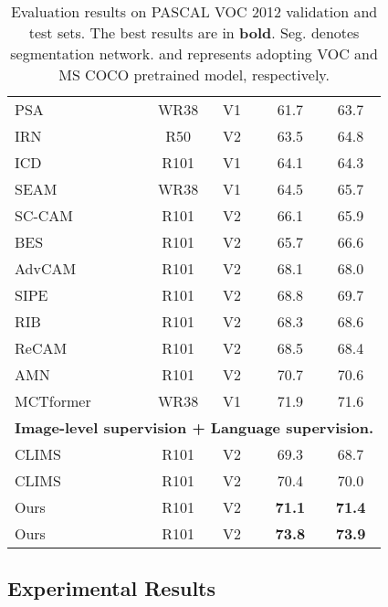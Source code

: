 \documentclass[10pt,twocolumn,letterpaper]{article}
\begin{document}
\begin{table}
\begin{tabular}{lclcc}
    PSA~\cite{Ahn2018PSA}       & WR38       & V1               & 61.7  & 63.7 \\
    IRN~\cite{Ahn2019IRN}       & R50        & V2               & 63.5  & 64.8 \\
ICD~\cite{Fan2020ICD}       & R101       & V1    & 64.1  & 64.3 \\
    SEAM~\cite{Wang2020SEAM}      & WR38       & V1               & 64.5  & 65.7 \\
    SC-CAM~\cite{Chang2020sc-cam}    & R101       & V2    & 66.1  & 65.9 \\
    BES~\cite{Chen2020bes}       & R101       & V2    & 65.7  & 66.6 \\
    AdvCAM~\cite{Lee2021advcam}    & R101       & V2               & 68.1  & 68.0 \\
    SIPE~\cite{Chen_2022_CVPR_SIPE}      & R101       & V2    & 68.8  & 69.7 \\
    RIB~\cite{Lee2021ReducingIB}       & R101       & V2               & 68.3  & 68.6 \\
    ReCAM~\cite{recam}     & R101       & V2               & 68.5  & 68.4 \\
    AMN~\cite{Lee2022AMN}       & R101       & V2    & 70.7  & 70.6 \\
    MCTformer~\cite{xu2022mctformer} & WR38       & V1     & 71.9  & 71.6 \\
\midrule
    \multicolumn{5}{l}{\textbf{Image-level supervision + Language supervision.}} \\
    
    CLIMS~\cite{Xie_2022_CLIMS}     & R101       & V2               & 69.3  & 68.7 \\
    CLIMS~\cite{Xie_2022_CLIMS}     & R101       & V2    & 70.4  & 70.0 \\
    Ours   & R101  & V2               & \textbf{71.1} & \textbf{71.4} \\
    Ours   & R101  & V2    & \textbf{73.8} & \textbf{73.9} \\
    \bottomrule
  \end{tabular}
  \caption{Evaluation results on PASCAL VOC 2012 validation and test sets. The best results are in \textbf{bold}. Seg. denotes segmentation network.  and  represents adopting VOC and MS COCO pretrained model, respectively.}
  \vspace{-4mm}
  \label{tab:segmentation performance VOC}
\end{table}

\subsection{Experimental Results}
\end{document}
